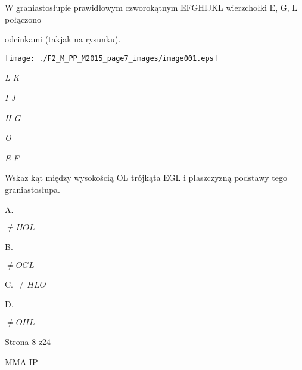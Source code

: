 \documentclass[a4paper,12pt]{article}
\begin{document}
W graniastosłupie prawidłowym czworokątnym EFGHIJKL wierzchołki E, G, L połączono

odcinkami (takjak na rysunku).
\begin{center}
\texttt{[image: ./F2\_M\_PP\_M2015\_page7\_images/image001.eps]}
\end{center}
{\it L K}

{\it I J}

{\it H G}

{\it O}

{\it E F}

Wskaz kąt między wysokością OL trójkąta EGL i płaszczyzną podstawy tego graniastosłupa.

A.

$\neq HOL$

B.

$\neq OGL$

C. $\neq HLO$

D.

$\neq OHL$

Strona 8 z24

MMA-IP
\end{document}
